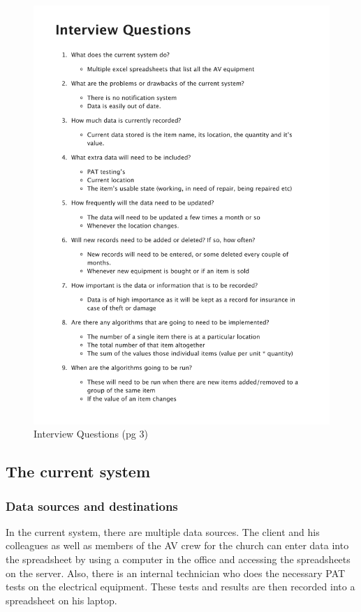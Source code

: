 \begin{figure}[H]
    \includegraphics[page=3,width=\textwidth]{./Analysis/Interview/interview_questions.pdf}
    \caption{Interview Questions (pg 3)} \label{fig: Interview Questions}
\end{figure}

\subsection{The current system}

\subsubsection{Data sources and destinations}

In the current system, there are multiple data sources. The client and his colleagues as well as members of the AV crew for the church can enter data into the spreadsheet by using a computer in the office and accessing the spreadsheets on the server. Also, there is an internal technician who does the necessary PAT tests on the electrical equipment. These tests and results are then recorded into a spreadsheet on his laptop.

